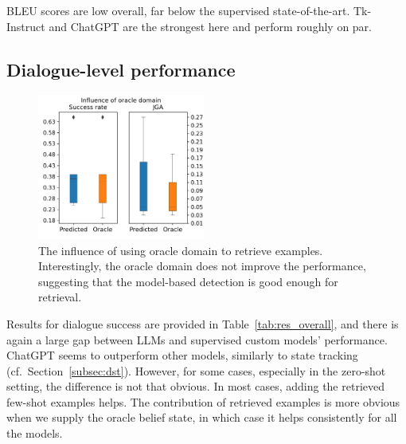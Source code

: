 BLEU scores are low overall, far below the supervised state-of-the-art. Tk-Instruct and ChatGPT are the strongest here and perform roughly on par.

\subsection{Dialogue-level performance}
\label{sec:dialogue-performance}
\begin{figure}[t]
    \centering
    \includegraphics[width=0.49\textwidth]{images/oracle_domains.png}
    \caption{The influence of using oracle domain to retrieve examples. Interestingly, the oracle domain does not improve the performance, suggesting that the model-based detection is good enough for retrieval.}
    \label{07:fig:oracle_domains}
\end{figure}
Results for dialogue success are provided in Table~\ref{tab:res_overall}, and there is again a large gap between LLMs and supervised custom models' performance.
ChatGPT seems to outperform other models, similarly to state tracking (cf.~Section~\ref{subsec:dst}).
However, for some cases, especially in the zero-shot setting, the difference is not that obvious.
In most cases, adding the retrieved few-shot examples helps.
The contribution of retrieved examples is more obvious when we supply the oracle belief state, in which case it helps consistently for all the models.


